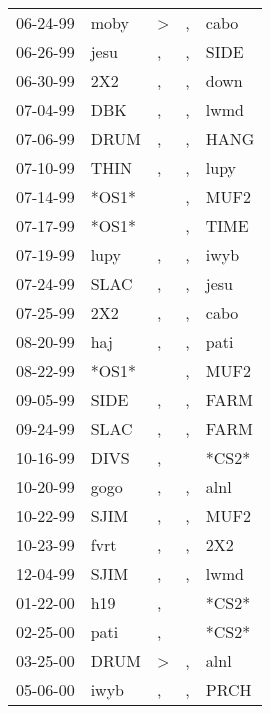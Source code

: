 \begin{supertabular}{lllll}
 06-24-99 &   moby &     \textgreater &                , &   cabo \\
 06-26-99 &   jesu &                , &                , &   SIDE \\
 06-30-99 &    2X2 &                , &                , &   down \\
 07-04-99 &    DBK &                , &                , &   lwmd \\
 07-06-99 &   DRUM &                , &                , &   HANG \\
 07-10-99 &   THIN &                , &                , &   lupy \\
 07-14-99 &  *OS1* &                  &                , &   MUF2 \\
 07-17-99 &  *OS1* &                  &                , &   TIME \\
 07-19-99 &   lupy &                , &                , &   iwyb \\
 07-24-99 &   SLAC &                , &                , &   jesu \\
 07-25-99 &    2X2 &                , &                , &   cabo \\
 08-20-99 &    haj &                , &                , &   pati \\
 08-22-99 &  *OS1* &                  &                , &   MUF2 \\
 09-05-99 &   SIDE &                , &                , &   FARM \\
 09-24-99 &   SLAC &                , &                , &   FARM \\
 10-16-99 &   DIVS &                , &                  &  *CS2* \\
 10-20-99 &   gogo &                , &                , &   alnl \\
 10-22-99 &   SJIM &                , &                , &   MUF2 \\
 10-23-99 &   fvrt &                , &                , &    2X2 \\
 12-04-99 &   SJIM &                , &                , &   lwmd \\
 01-22-00 &    h19 &                , &                  &  *CS2* \\
 02-25-00 &   pati &                , &                  &  *CS2* \\
 03-25-00 &   DRUM &     \textgreater &                , &   alnl \\
 05-06-00 &   iwyb &                , &                , &   PRCH \\

\end{supertabular}
